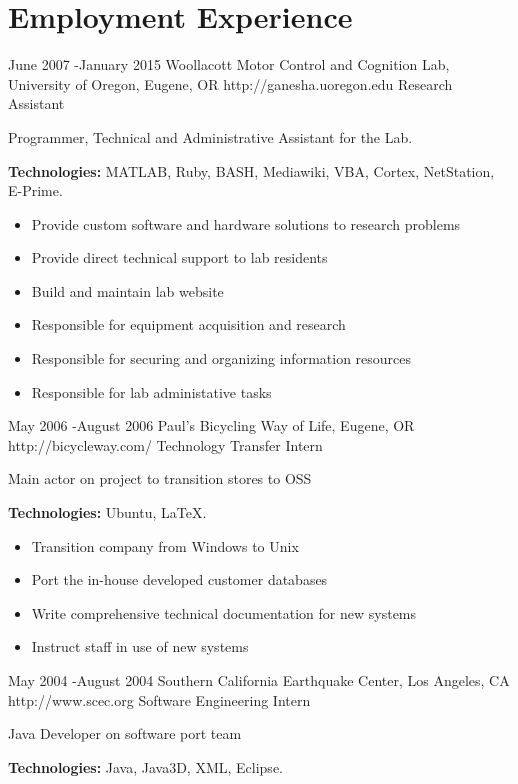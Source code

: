 \documentclass[10pt]{article} %
\begin{document}
\section{Employment Experience}

\job
{June 2007 -}{January 2015}
{Woollacott Motor Control and Cognition Lab, University of Oregon, Eugene, OR}
{http://ganesha.uoregon.edu}
{Research Assistant}
{Programmer, Technical and Administrative Assistant for the Lab.\\
\rule{0mm}{5mm}\textbf{Technologies:} MATLAB, Ruby, BASH, Mediawiki, VBA, Cortex, NetStation, E-Prime.}

\begin{itemize}
\item{Provide custom software and hardware solutions to research problems}
\item{Provide direct technical support to lab residents}
\item{Build and maintain lab website}
\item{Responsible for equipment acquisition and research}
\item{Responsible for securing and organizing information resources}
\item{Responsible for lab administative tasks}
\end{itemize}


\job
{May 2006 -}{August 2006}
{Paul's Bicycling Way of Life, Eugene, OR}
{http://bicycleway.com/}
{Technology Transfer Intern}
{Main actor on project to transition stores to OSS \\
\rule{0mm}{5mm}\textbf{Technologies:} Ubuntu, LaTeX.}

\begin{itemize}
\item{Transition company from Windows to Unix}
\item{Port the in-house developed customer databases}
\item{Write comprehensive technical documentation for new systems}
\item{Instruct staff in use of new systems}
\end{itemize}


\job
{May 2004 -}{August 2004}
{Southern California Earthquake Center, Los Angeles, CA}
{http://www.scec.org}
{Software Engineering Intern}
{Java Developer on software port team \\
\rule{0mm}{5mm}\textbf{Technologies:} Java, Java3D, XML, Eclipse.}
\end{document}
